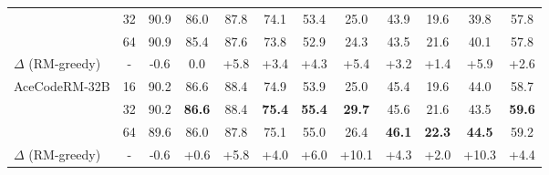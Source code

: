 \begin{table*}[!t]
{\begin{tabular}{lccccccccccc}
 & 32 & 90.9 & 86.0 & 87.8 & 74.1 & 53.4 & 25.0 & 43.9 & 19.6 & 39.8 & 57.8 \\
 & 64 & 90.9 & 85.4 & 87.6 & 73.8 & 52.9 & 24.3 & 43.5 & 21.6 & 40.1 & 57.8 \\
\rowcolor{LightCyan}
 $\Delta$ (RM-greedy) & - & -0.6 & 0.0 & +5.8 & +3.4 & +4.3 & +5.4 & +3.2 & +1.4 & +5.9 & +2.6 \\
 \midrule
\multirow{3}{*}{AceCodeRM-32B} & 16 & 90.2 & 86.6 & 88.4 & 74.9 & 53.9 & 25.0 & 45.4 & 19.6 & 44.0 & 58.7 \\
 & 32 & 90.2 & \textbf{86.6} & 88.4 & \textbf{75.4} & \textbf{55.4} & \textbf{29.7} & 45.6 & 21.6 & 43.5 & \textbf{59.6}     \\
 & 64 & 89.6 & 86.0 & 87.8 & 75.1 & 55.0 & 26.4 & \textbf{46.1} & \textbf{22.3} & \textbf{44.5} & 59.2 \\
\rowcolor{LightCyan}
$\Delta$ (RM-greedy) & - & -0.6 & +0.6 & +5.8 & +4.0 & +6.0 & +10.1 & +4.3 & +2.0 & +10.3 & +4.4 \\
\bottomrule
\end{tabular}
}
\end{table*}